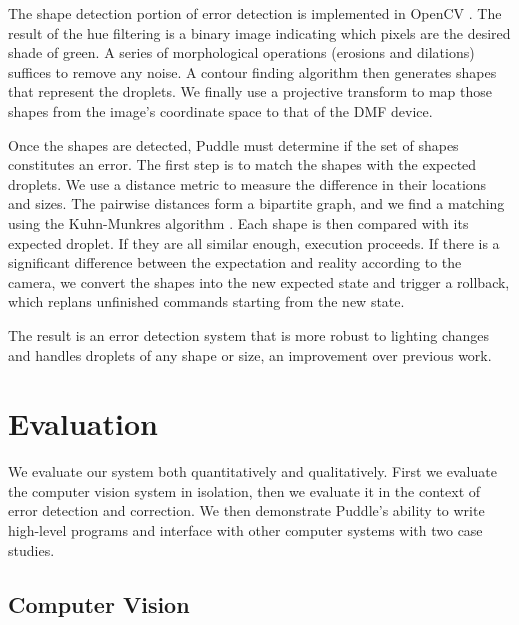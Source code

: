 \documentclass[sigplan, screen]{acmart}
\begin{document}
The shape detection portion of error detection is implemented in OpenCV \cite{opencv}.
The result of the hue filtering is a binary image indicating which pixels are the desired shade of green.
A series of morphological operations (erosions and dilations) suffices to remove any noise.
A contour finding algorithm \cite{findcontours} then generates shapes that represent the droplets.
We finally use a projective transform to map those shapes from the image's coordinate space to that of the DMF device.

Once the shapes are detected, Puddle must determine if the set of shapes constitutes an error.
The first step is to match the shapes with the expected droplets.
We use a distance metric to measure the difference in their locations and sizes.
The pairwise distances form a bipartite graph, and we find a matching using the Kuhn-Munkres algorithm \cite{munkres}.
Each shape is then compared with its expected droplet.
If they are all similar enough, execution proceeds.
If there is a significant difference between the expectation and reality according to the camera, we convert the shapes into the new expected state and trigger a rollback, which replans unfinished commands starting from the new state.

The result is an error detection system that is more robust to lighting changes and handles droplets of any shape or size, an improvement over previous work.


\section{Evaluation}
\label{sec:eval}

We evaluate our system both quantitatively and qualitatively.
First we evaluate the computer vision system in isolation, then we evaluate it in the context of error detection and correction.
We then demonstrate Puddle's ability to write high-level programs and interface with other computer systems with two case studies.

\subsection{Computer Vision}
\label{sec:vision-eval}
\end{document}
